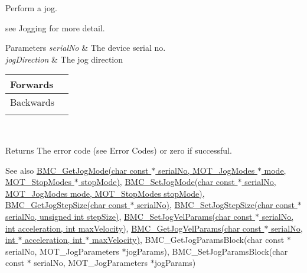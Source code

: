 Perform a jog. 

see Jogging for more detail.


\begin{DoxyParams}{Parameters}
{\em serial\+No} & The device serial no. \\
\hline
{\em jog\+Direction} & The jog direction \begin{tabularx}{\linewidth}{|*{2}{>{\raggedright\arraybackslash}X|}}\hline
Forwards&1 \\\cline{1-2}
Backwards&2 \\\cline{1-2}
\end{tabularx}
\\
\hline
\end{DoxyParams}
\begin{DoxyReturn}{Returns}
The error code (see Error Codes) or zero if successful. 
\end{DoxyReturn}
\begin{DoxySeeAlso}{See also}
\hyperlink{group___k_cube_brushless_motor_gafc92fe606b9cd874d7f28d7791e8a06e}{B\+M\+C\+\_\+\+Get\+Jog\+Mode(char const $\ast$ serial\+No, M\+O\+T\+\_\+\+Jog\+Modes $\ast$ mode, M\+O\+T\+\_\+\+Stop\+Modes $\ast$ stop\+Mode)}, \hyperlink{group___k_cube_brushless_motor_ga5cc6ed2932a1761531546d41a9240136}{B\+M\+C\+\_\+\+Set\+Jog\+Mode(char const $\ast$ serial\+No, M\+O\+T\+\_\+\+Jog\+Modes mode, M\+O\+T\+\_\+\+Stop\+Modes stop\+Mode)}, \hyperlink{group___k_cube_brushless_motor_ga2a2db2c5c7f24bbff73f17af4e10bdd1}{B\+M\+C\+\_\+\+Get\+Jog\+Step\+Size(char const $\ast$ serial\+No)}, \hyperlink{group___k_cube_brushless_motor_gaeff03c620c9c2a0719c58dc9d97ed8c3}{B\+M\+C\+\_\+\+Set\+Jog\+Step\+Size(char const $\ast$ serial\+No, unsigned int step\+Size)}, \hyperlink{group___k_cube_brushless_motor_ga5344f441c200c330ef267401054c307e}{B\+M\+C\+\_\+\+Set\+Jog\+Vel\+Params(char const $\ast$ serial\+No, int acceleration, int max\+Velocity)}, \hyperlink{group___k_cube_brushless_motor_ga096d9f530ba9e298f7c687a891b6182f}{B\+M\+C\+\_\+\+Get\+Jog\+Vel\+Params(char const $\ast$ serial\+No, int $\ast$ acceleration, int $\ast$ max\+Velocity)}, B\+M\+C\+\_\+\+Get\+Jog\+Params\+Block(char const $\ast$ serial\+No, M\+O\+T\+\_\+\+Jog\+Parameters $\ast$jog\+Params), B\+M\+C\+\_\+\+Set\+Jog\+Params\+Block(char const $\ast$ serial\+No, M\+O\+T\+\_\+\+Jog\+Parameters $\ast$jog\+Params)


\end{DoxySeeAlso}

\begin{DoxyCodeInclude}
\end{DoxyCodeInclude}
